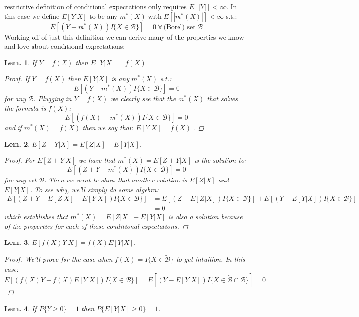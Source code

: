\documentclass{tufte-book}
\theoremstyle{mytheoremstyle}
\theoremstyle{mylemstyle}
\newtheorem*{lem}{Lem.}
\theoremstyle{mydefstyle}
\begin{document}
 restrictive definition of conditional expectations only requires \(E[|Y|] < \infty\). In this case we define \(E[Y|X]\) to be any \(m^*(X)\) with \(E[|m^*(X)|] < \infty\) s.t.:
	\[E[(Y - m^*(X)) I\{X \in \mathcal{B}\}] = 0\ \forall\ \text{(Borel) set } \mathcal{B}\]
Working off of just this definition we can derive many of the properties we know and love about conditional expectations: 
\begin{lem}If \(Y = f(X)\) then \(E[Y | X] = f(X)\). 
	\begin{proof} If \(Y = f(X)\) then \(E[Y|X]\) is any \(m^*(X)\) s.t.:
			\[E[(Y - m^*(X))I\{X \in \mathcal{B}\}] = 0\]
		for any \(\mathcal{B}\). Plugging in \(Y = f(X)\) we clearly see that the \(m^*(X)\) that solves the formula is \(f(X)\):
			\[E[(f(X) - m^*(X))I\{X \in \mathcal{B}\}] = 0\]
		and if \(m^*(X) = f(X)\) then we say that: \(E[Y|X] = f(X)\ \).
	\end{proof}
\end{lem}
\begin{lem} \(E[Z + Y | X] = E[Z | X] + E[Y | X]\). \begin{proof} For \(E[Z + Y | X]\) we have that \(m^*(X) = E[Z + Y| X]\) is the solution to:
		\[E[(Z+Y - m^*(X))I\{X\in \mathcal{B}\}] = 0\]
	for any set \(\mathcal{B}\). Then we want to show that another solution is \(E[Z|X]\) and \(E[Y|X]\). To see why, we'll simply do some algebra:
	\begin{align*}
		E[(Z + Y - E[Z|X] - E[Y | X])I\{X \in \mathcal{B}\}] & = E[(Z - E[Z|X])I\{X \in \mathcal{B}\}] + E[(Y - E[Y | X])I\{X \in \mathcal{B}\}] \\
											& = 0
	\end{align*}
	which establishes that \(m^*(X) = E[Z|X] + E[Y|X]\) is also a solution because of the properties for each of those conditional expectations. 
	\end{proof}
\end{lem}
\begin{lem}\(E[f(X)Y|X] = f(X)E[Y|X]\).
	\begin{proof} We'll prove for the case when \(f(X) = I\{X \in \tilde{\mathcal{B}}\}\) to get intuition. In this case:
			\[E[(f(X)Y - f(X)E[Y|X])I\{X \in \mathcal{B}\}] = E[(Y - E[Y|X])I\{X \in \tilde{\mathcal{B}} \cap \mathcal{B}\}] = 0\]
	\end{proof}
\end{lem}
\begin{lem} If \(P\{Y \ge 0\} = 1\) then \(P\{E[Y|X] \ge 0\} = 1\). \end{lem}
\end{document}
